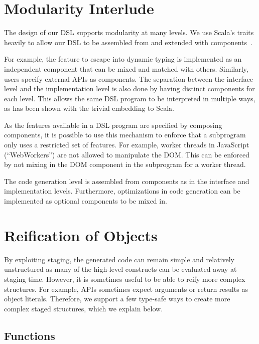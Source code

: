 \documentclass[runningheads,a4paper]{llncs}
\begin{document}

\section{Modularity Interlude}\label{sec:modularity}

The design of our DSL supports modularity at many levels. We use
Scala's traits heavily to allow our DSL to be assembled from and
extended with components~\cite{components-scala}.

For example, the feature to escape into dynamic typing is implemented
as an independent component that can be mixed and matched with
others. Similarly, users specify external APIs as components. The
separation between the interface level and the implementation level is
also done by having distinct components for each level. This allows
the same DSL program to be interpreted in multiple ways, as has been
shown with the trivial embedding to Scala.

As the features available in a DSL program are specified by composing
components, it is possible to use this mechanism to enforce that a
subprogram only uses a restricted set of features. For example, worker
threads in JavaScript (``WebWorkers'') are not allowed to manipulate
the DOM. This can be enforced by not mixing in the DOM component in
the subprogram for a worker thread.

The code generation level is assembled from components as in the
interface and implementation levels. Furthermore, optimizations in
code generation can be implemented as optional components to be mixed
in.

\section{Reification of Objects}\label{sec:reification}

By exploiting staging, the generated code can remain simple and
relatively unstructured as many of the high-level constructs can be
evaluated away at staging time. However, it is sometimes useful to be
able to reify more complex structures. For example, APIs sometimes
expect arguments or return results as object literals. Therefore, we
support a few type-safe ways to create more complex staged structures,
which we explain below.

\subsection{Functions}\label{sec:functions}
\end{document}

